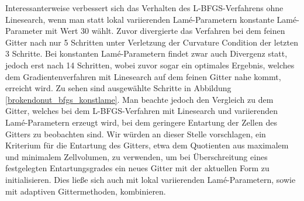 Interessanterweise verbessert sich das Verhalten des L-BFGS-Verfahrens ohne Linesearch, wenn man statt lokal variierenden Lamé-Parametern konstante Lamé-Parameter mit Wert 30 wählt. Zuvor divergierte das Verfahren bei dem feinen Gitter nach nur 5 Schritten unter Verletzung der Curvature Condition der letzten 3 Schritte. Bei konstanten Lamé-Parametern findet zwar auch Divergenz statt, jedoch erst nach 14 Schritten, wobei zuvor sogar ein optimales Ergebnis, welches dem Gradientenverfahren mit Linesearch auf dem feinen Gitter nahe kommt, erreicht wird. Zu sehen sind ausgewählte Schritte in Abbildung \ref{brokendonut_bfgs_konstlame}. Man beachte jedoch den Vergleich zu dem Gitter, welches bei dem L-BFGS-Verfahren mit Linesearch und variierenden Lamé-Parametern erzeugt wird, bei dem geringere Entartung der Zellen des Gitters zu beobachten sind. Wir würden an dieser Stelle vorschlagen, ein Kriterium für die Entartung des Gitters, etwa dem Quotienten aus maximalem und minimalem Zellvolumen, zu verwenden, um bei Überschreitung eines festgelegten Entartungsgrades ein neues Gitter mit der aktuellen Form zu initialisieren. Dies ließe sich auch mit lokal variierenden Lamé-Parametern, sowie mit adaptiven Gittermethoden, kombinieren.

